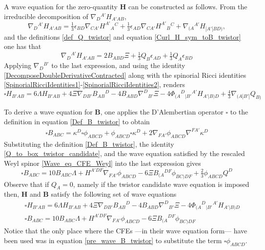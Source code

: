 \documentclass[10pt,a4paper]{article}
\theoremstyle{plain}
\def\bmB{{\bm B}}
\def\bmH{{\bm H}}
\begin{document}
{A wave equation for the zero-quantity $\bmH$ can be constructed as
follows.  From the irreducible decomposition of
$\nabla_D{}^{A'}H_{A'AB}$,
\[
\nabla_{D}{}^{A'}H_{A'AB} = \tfrac{1}{3} \epsilon _{BD}
\nabla_{CA'}H^{A'}{}_{A}{}^{C} + \tfrac{1}{3} \epsilon _{AD}
\nabla_{CA'}H^{A'}{}_{B}{}^{C} + \nabla_{(A}{}^{A'}H_{|A'|BD)},
\]
and the definitions \eqref{def_Q_twistor} and equation
\eqref{Curl_H_sym_toB_twistor} one has that
\[
\nabla_{D}{}^{A'}H_{A'AB} = 2 B_{ABD} \Xi + \tfrac{1}{3} Q_{B}
\epsilon _{AD} + \tfrac{1}{3} Q_{A} \epsilon _{BD}
\]
Applying $\nabla_{D}{}^{B'}$ to the last expression, and using the
identity \eqref{DecomposeDoubleDerivativeContracted} along with the
spinorial Ricci identities
\eqref{SpinorialRicciIdentities1}-\eqref{SpinorialRicciIdentities2},
renders
\begin{equation}\label{wave_H_twistor}
  \square H_{B'AB} = 6 \Lambda H_{B'AB} + 4 \Xi
  \nabla_{DB'}B_{AB}{}^{D} -4 B_{ABD} \nabla^{D}{}_{B'}\Xi -4
  \Phi_{(A}{}^{D}{}_{|B'}{}^{A'}H_{A'|B)D} + \tfrac{4}{3}
  \nabla_{(A|B'|}Q_{B)}
\end{equation}

\noindent To derive a wave equation for $\bmB$, one applies the D'Alembertian operator
$\square$ to the definition in equation \eqref{Def_B_twistor} to obtain
\begin{align}\label{pre_wave_B_twistor}
\square B_{ABC} = \kappa ^{D} \square \phi _{ABCD} + \phi _{ABCD}
\square \kappa ^{D} + 2 \nabla_{FA'}\phi _{ABCD} \nabla^{FA'}\kappa
^{D}
\end{align}
Substituting the definition \eqref{Def_B_twistor}, the identity
\eqref{Q_to_box_twistor_candidate}, and the wave equation satisfied by
the rescaled Weyl spinor \eqref{Wave_eq_CFE_Weyl} into the last expression gives
\begin{equation}\label{wave_B_twistor}
\square B_{ABC} = 10 B_{ABC} \Lambda + H^{A'DF} \nabla_{FA'}\phi _{ABCD}  -6 \Xi B_{(A}{}^{DF}\phi
_{BC)DF} + \tfrac{2}{3} \phi _{ABCD} Q^{D}
\end{equation}
Observe that if $Q_{A}=0$, namely if the twistor candidate wave equation is imposed then,
$\bmH$ and $\bmB$ satisfy the following set of wave equations
\begin{subequations}
\begin{eqnarray}
  && \square H_{B'AB} = 6 \Lambda H_{B'AB} + 4 \Xi
  \nabla_{DB'}B_{AB}{}^{D}  -4 B_{ABD} \nabla^{D}{}_{B'}\Xi   -4 \Phi_{(A}{}^{D}{}_{|B'}{}^{A'}H_{A'|B)D}
   \label{Hom_wave_HandB1} \\
 && \square B_{ABC} = 10 B_{ABC} \Lambda + H^{A'DF} \nabla_{FA'}\phi _{ABCD}  -6 \Xi B_{(A}{}^{DF}\phi
_{BC)DF}  \label{Hom_wave_HandB2}
\end{eqnarray}
\end{subequations}
Notice that the only place where the CFEs ---in their wave equation form---
have been used was in equation \eqref{pre_wave_B_twistor}
to substitute the term $\square \phi _{ABCD}$.

}
\end{document}
